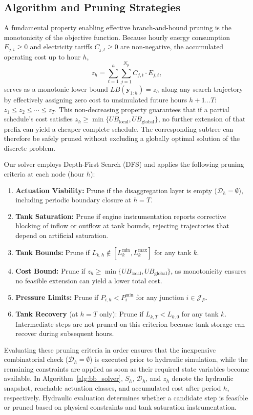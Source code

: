 \documentclass[Journal,letterpaper,InsideFigs]{ascelike-new}
\begin{document}
\subsection{Algorithm and Pruning Strategies}

A fundamental property enabling effective branch-and-bound pruning is the monotonicity of the objective function. Because hourly energy consumption $E_{j,t} \ge 0$ and electricity tariffs $C_{j,t} \ge 0$ are non-negative, the accumulated operating cost up to hour $h$,
\[
	z_h = \sum_{t=1}^{h} \sum_{j=1}^{N_p} C_{j,t} \cdot E_{j,t},
\]
serves as a monotonic lower bound $LB(\mathbf{y}_{1:h}) = z_h$ along any search trajectory by effectively assigning zero cost to unsimulated future hours $h+1 \dots T$: $z_1 \le z_2 \le \cdots \le z_T$. This non-decreasing property guarantees that if a partial schedule's cost satisfies $z_h \ge \min\{UB_{\mathrm{local}}, UB_{\mathrm{global}}\}$, no further extension of that prefix can yield a cheaper complete schedule. The corresponding subtree can therefore be safely pruned without excluding a globally optimal solution of the discrete problem.

Our solver employs Depth-First Search (DFS) and applies the following pruning criteria at each node (hour \(h\)):
\begin{enumerate}
	\item \textbf{Actuation Viability:} Prune if the disaggregation layer is empty ($\mathcal{D}_h = \emptyset$), including periodic boundary closure at $h=T$.
	\item \textbf{Tank Saturation:} Prune if engine instrumentation reports corrective blocking of inflow or outflow at tank bounds, rejecting trajectories that depend on artificial saturation.
	\item \textbf{Tank Bounds:} Prune if $L_{k,h} \notin [L_{k}^{\min}, L_{k}^{\max}]$ for any tank $k$.
	\item \textbf{Cost Bound:} Prune if $z_h \ge \min\{UB_{\mathrm{local}}, UB_{\mathrm{global}}\}$, as monotonicity ensures no feasible extension can yield a lower total cost.
	\item \textbf{Pressure Limits:} Prune if $P_{i,h} < P_{i}^{\min}$ for any junction $i\in\mathcal{J}_P$.
	\item \textbf{Tank Recovery} (at $h=T$ only): Prune if $L_{k,T} < L_{k,0}$ for any tank $k$. Intermediate steps are not pruned on this criterion because tank storage can recover during subsequent hours.
\end{enumerate}
Evaluating these pruning criteria in order ensures that the inexpensive combinatorial check ($\mathcal{D}_h = \emptyset$) is executed prior to hydraulic simulation, while the remaining constraints are applied as soon as their required state variables become available. In Algorithm~\ref{alg:bb_solver}, $S_h$, $\mathcal{D}_h$, and $z_h$ denote the hydraulic snapshot, reachable actuation classes, and accumulated cost after period $h$, respectively. Hydraulic evaluation determines whether a candidate step is feasible or pruned based on physical constraints and tank saturation instrumentation.
\end{document}

